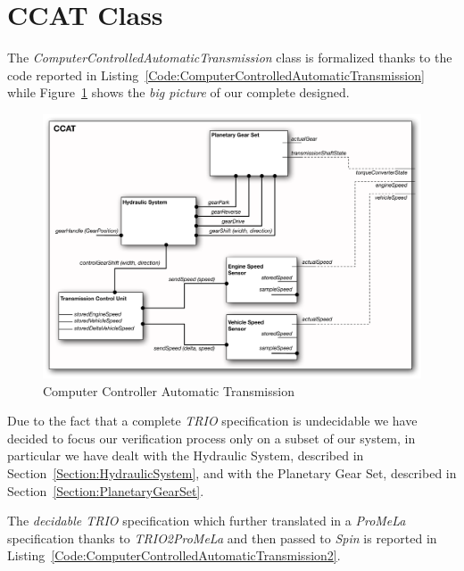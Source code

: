 \section{CCAT Class}
\label{Section:ComputerControlledAutomaticTransmission}
The \emph{ComputerControlledAutomaticTransmission} class is formalized thanks to the code reported in Listing~\ref{Code:ComputerControlledAutomaticTransmission} while Figure~\ref{Figure:CCAT} shows the \emph{big picture} of our complete designed.



\thispagestyle{empty}
\begin{figure}[!p]
\vspace{-3 cm}
\centerline{\includegraphics[scale=0.8,angle=-90]{images/CCAT.pdf}}
\caption{Computer Controller Automatic Transmission}
\label{Figure:CCAT}
\end{figure}

\newpage
Due to the fact that a complete \emph{TRIO} specification is undecidable we have decided to focus our verification process only on a subset of our system, in particular we have dealt with the Hydraulic System, described in Section~\ref{Section:HydraulicSystem}, and with the Planetary Gear Set, described in Section~\ref{Section:PlanetaryGearSet}.

The \emph{decidable TRIO} specification which further translated in a \emph{ProMeLa} specification thanks to \emph{TRIO2ProMeLa} and then passed to \emph{Spin} is reported in Listing~\ref{Code:ComputerControlledAutomaticTransmission2}.

